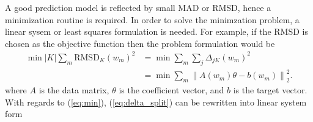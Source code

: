 \documentclass[12pt]{article}
\begin{document}
A good prediction model is reflected by small MAD or RMSD, hence a minimization routine is required. In order to solve the minimzation problem, a linear sysem or least squares formulation is needed. For example, if the RMSD is chosen as the objective function then the problem formulation would be
\begin{equation}
    \label{eq:min}
    \begin{split}
        \min |K| \sum_m \text{RMSD}_K(w_m)^2 &= \min \sum_m \sum_j \Delta_{jK}(w_m)^2 \\
        &= \min \sum_m \left\| A(w_m)\theta - b(w_m)\right\|_2^2.
    \end{split}
\end{equation}
\iffalse
where $A$ is the data matrix, $\theta$ is the coefficient vector, and $b$ is the target vector.
With regards to (\ref{eq:min}), (\ref{eq:delta_split}) can be rewritten into linear system form
\end{document}
